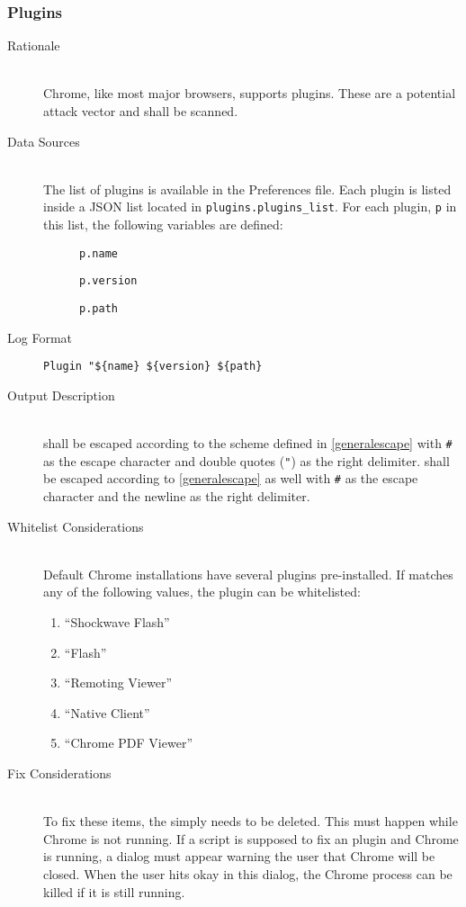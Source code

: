 \subsubsection{Plugins}
\begin{description}
\item[Rationale] \hfill \\
Chrome, like most major browsers, supports plugins.  These are a potential
attack vector and shall be scanned.
\item[Data Sources] \hfill \\
The list of plugins is available in the Preferences file.  Each plugin is listed
inside a JSON list located in \verb|plugins.plugins_list|.  For each plugin,
\texttt{p} in this list, the following variables are defined:
\begin{description}
\item[] \texttt{p.name}
\item[] \texttt{p.version}
\item[] \texttt{p.path}
\end{description}
\item[Log Format] \hfill
\vspace{-\baselineskip}
\begin{verbatim}
Plugin "${name} ${version} ${path}
\end{verbatim}
\item[Output Description] \hfill \\
 shall be escaped according to the scheme defined in
\ref{generalescape} with \verb|#| as the escape character and double quotes
(\verb|"|) as the right delimiter.   shall be escaped according to
\ref{generalescape} as well with \verb|#| as the escape character and the
newline as the right delimiter.
\item[Whitelist Considerations] \hfill \\
Default Chrome installations have several plugins pre-installed.  If 
matches any of the following values, the plugin can be whitelisted:
\begin{enumerate}
  \item ``Shockwave Flash''
  \item ``Flash''
  \item ``Remoting Viewer''
  \item ``Native Client''
  \item ``Chrome PDF Viewer''
\end{enumerate}
\item[Fix Considerations] \hfill \\
To fix these items, the  simply needs to be deleted.  This must
happen while Chrome is not running.  If a script is supposed to fix an
plugin and Chrome is running, a dialog must appear warning the user that
Chrome will be closed.  When the user hits okay in this dialog, the Chrome
process can be killed if it is still running.  
\end{description}

